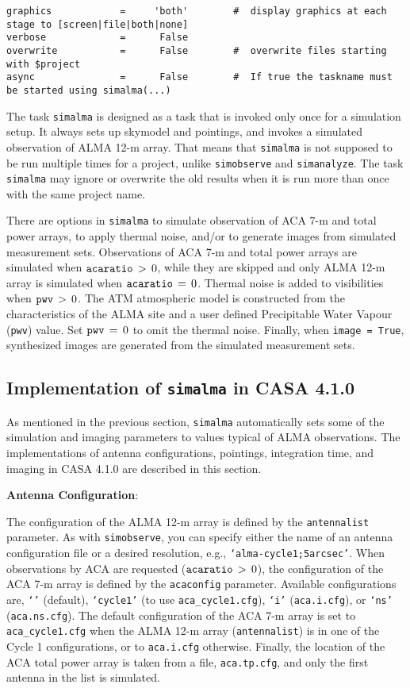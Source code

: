 \begin{verbatim}
graphics            =     'both'        #  display graphics at each stage to [screen|file|both|none]
verbose             =      False        
overwrite           =      False        #  overwrite files starting with $project
async               =      False        #  If true the taskname must be started using simalma(...)
\end{verbatim}
\normalsize

The task {\tt simalma} is designed as a task that is invoked only once for
a simulation setup. 
It always sets up skymodel and pointings, and invokes a simulated
observation of ALMA 12-m array.
That means that {\tt simalma} is not supposed to be run multiple times for a
project, unlike {\tt simobserve} and {\tt simanalyze}. 
The task {\tt simalma} may ignore or overwrite the old results when it is
run more than once with the same project name. 

There are options in {\tt simalma} to simulate
observation of ACA 7-m and total power arrays, to apply thermal noise, and/or
to generate images from simulated measurement sets. 
Observations of ACA 7-m and total power arrays are simulated when
$ {\tt acaratio} \, > \, 0 $, 
while they are skipped and only ALMA 12-m array is simulated when
$ {\tt acaratio} \, = \, 0 $.
Thermal noise is added to visibilities when $ {\tt pwv} \, > \, 0 $.
The ATM atmospheric model is constructed from the characteristics of
the ALMA site and a user defined Precipitable Water Vapour ({\tt pwv})
value. 
Set $ {\tt pwv} \, = \, 0 $ to omit the thermal noise. 
Finally, when {\tt image = True}, synthesized images are generated
from the simulated measurement sets.

\subsection{Implementation of {\tt simalma} in CASA 4.1.0}
\label{section:sim.simalma.casa410}

As mentioned in the previous section, {\tt simalma} automatically sets
some of the simulation and imaging parameters to values typical of ALMA
observations. The implementations of antenna configurations, pointings,
integration time, and imaging in CASA 4.1.0 are described in this
section.

\smallskip
{\bf Antenna Configuration}:

The configuration of the ALMA 12-m array is defined by the {\tt antennalist}
parameter. As with {\tt simobserve}, you can specify either the name of an antenna configuration
file or a desired resolution, e.g., {\tt `alma-cycle1;5arcsec'}. 
When observations by ACA are requested ($ {\tt acaratio} \, > \, 0 $), 
the configuration of the ACA 7-m array is defined by the {\tt acaconfig}
parameter. Available configurations are, {\tt `'} (default),
{\tt `cycle1'} (to use {\tt aca\_cycle1.cfg}),
{\tt `i'} ({\tt aca.i.cfg}), or
{\tt `ns'} ({\tt aca.ns.cfg}). The default
configuration of the ACA 7-m array is set to {\tt aca\_cycle1.cfg}
when the ALMA 12-m array ({\tt antennalist}) is in one of the Cycle 1
configurations, or to {\tt aca.i.cfg} otherwise.
Finally, the location of the ACA total power array is
taken from a file, {\tt aca.tp.cfg}, and only the first antenna
in the list is simulated.


